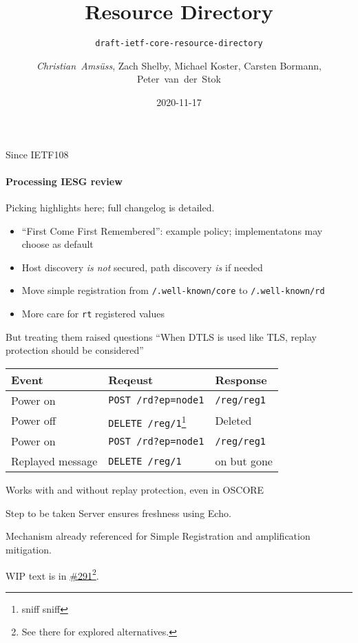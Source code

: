 \documentclass[aspectratio=169]{beamer}
\title{Resource Directory}
\subtitle{\texttt{draft-ietf-core-resource-directory}}
\author{\textit{Christian~Amsüss}, Zach Shelby, Michael Koster, Carsten Bormann, Peter~van~der~Stok}
\date{2020-11-17}
\begin{document}
\frame{\titlepage}

\begin{frame}{Since IETF108}\Large
	\framesubtitle{Processing IESG review}

	Picking highlights here; full changelog is detailed.

	\bigskip

	\begin{itemize}
		\item “First Come First Remembered”: example policy; implementatons may choose as default
		\item Host discovery {\em is not} secured, path discovery {\em is} if needed
		\item Move simple registration from \texttt{/.well-known/core} to \texttt{/.well-known/rd}
		\item More care for \texttt{rt} registered values
	\end{itemize}
\end{frame}

\begin{frame}{But treating them raised questions}\Large
	“When DTLS is used like TLS, replay protection should be considered”

	\bigskip

	\begin{tabular}{lll}
		Event & Reqeust & Response \\ \hline
		Power on & \texttt{POST /rd?ep=node1} & \texttt{/reg/reg1} \\
		Power off & \texttt{DELETE /reg/1}\footnote{sniff sniff} & Deleted\\
		Power on & \texttt{POST /rd?ep=node1} & \texttt{/reg/reg1} \\
		Replayed message & \texttt{DELETE /reg/1} & on but gone \\
	\end{tabular}

	\bigskip

	Works with and without replay protection, even in OSCORE
\end{frame}

\begin{frame}{Step to be taken}\Large
	Server ensures freshness using Echo.

	\bigskip

	Mechanism already referenced for Simple Registration and amplification mitigation.

	\bigskip

	WIP text is in \href{https://github.com/core-wg/resource-directory/pull/291}{\#291}\footnote{See there for explored alternatives.}.
\end{frame}
\end{document}
